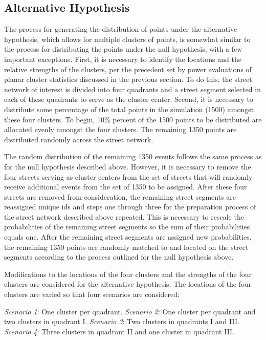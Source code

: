 \documentclass[12pt, letterpaper]{article}
\begin{document}
\subsection {Alternative Hypothesis}
The process for generating the distribution of points under the alternative hypothesis, which allows for multiple clusters of points, is somewhat similar to the process for distributing the points under the null hypothesis, with a few important exceptions. First, it is necessary to identify the locations and the relative strengths of the clusters, per the precedent set by power evaluations of planar cluster statistics discussed in the previous section. To do this, the street network of interest is divided into four quadrants and a street segment selected in each of these quadrants to serve as the cluster center. Second, it is necessary to distribute some percentage of the total points in the simulation (1500) amongst these four clusters. To begin, 10\% percent of the 1500 points to be distributed are allocated evenly amongst the four clusters. The remaining 1350 points are distributed randomly across the street network. 

The random distribution of the remaining 1350 events follows the same process as for the null hypothesis described above. However, it is necessary to remove the four streets serving as cluster centers from the set of streets that will randomly receive additional events from the set of 1350 to be assigned. After these four streets are removed from consideration, the remaining street segments are reassigned unique ids and steps one through three for the preparation process of the street network described above repeated. This is necessary to rescale the probabilities of the remaining street segments so the sum of their probabilities equals one. After the remaining street segments are assigned new probabilities, the remaining 1350 points are randomly matched to and located on the street segments according to the process outlined for the null hypothesis above.

Modifications to the locations of the four clusters and the strengths of the four clusters are considered for the alternative hypothesis. The locations of the four clusters are varied so that four scenarios are considered:

\emph{Scenario 1}: One cluster per quadrant.
\emph{Scenario 2}: One cluster per quadrant and two clusters in quadrant I.
\emph{Scenario 3}: Two clusters in quadrants I and III.
\emph{Scenario 4}: Three clusters in quadrant II and one cluster in quadrant III.
\end{document}
